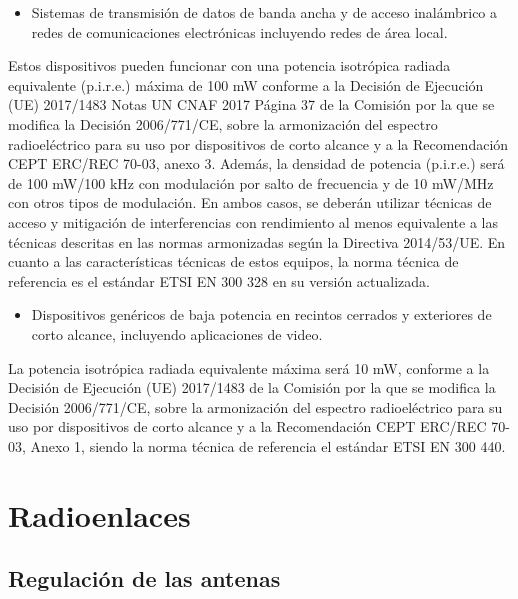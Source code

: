 \documentclass{article}
\begin{document}
\begin{itemize}

    \item Sistemas de transmisión de datos de banda ancha y de acceso inalámbrico
    a redes de comunicaciones electrónicas incluyendo redes de área local.

\end{itemize}

    Estos dispositivos pueden funcionar con una potencia isotrópica radiada equivalente
    (p.i.r.e.) máxima de 100 mW conforme a la Decisión de Ejecución (UE) 2017/1483
    Notas UN CNAF 2017 Página 37
    de la Comisión por la que se modifica la Decisión 2006/771/CE, sobre la
    armonización del espectro radioeléctrico para su uso por dispositivos de corto
    alcance y a la Recomendación CEPT ERC/REC 70-03, anexo 3.
    Además, la densidad de potencia (p.i.r.e.) será de 100 mW/100 kHz con modulación
    por salto de frecuencia y de 10 mW/MHz con otros tipos de modulación. En ambos
    casos, se deberán utilizar técnicas de acceso y mitigación de interferencias con
    rendimiento al menos equivalente a las técnicas descritas en las normas
    armonizadas según la Directiva 2014/53/UE.
    En cuanto a las características técnicas de estos equipos, la norma técnica de
    referencia es el estándar ETSI EN 300 328 en su versión actualizada.

\begin{itemize}
    \item Dispositivos genéricos de baja potencia en recintos cerrados y exteriores
    de corto alcance, incluyendo aplicaciones de video.
\end{itemize}
    La potencia isotrópica radiada equivalente máxima será 10 mW, conforme a la
    Decisión de Ejecución (UE) 2017/1483 de la Comisión por la que se modifica la
    Decisión 2006/771/CE, sobre la armonización del espectro radioeléctrico para su uso
    por dispositivos de corto alcance y a la Recomendación CEPT ERC/REC 70-03,
    Anexo 1, siendo la norma técnica de referencia el estándar ETSI EN 300 440. 


\section{Radioenlaces}

\subsection{Regulación de las antenas}
\end{document}
